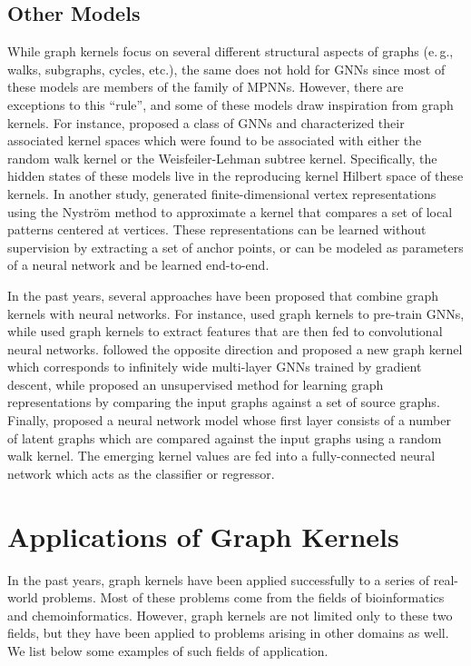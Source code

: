 \documentclass[twoside,11pt]{article}
\newcommand{\eg}{e.\,g., }
\begin{document}
\subsection{Other Models}
While graph kernels focus on several different structural aspects of graphs (\eg walks, subgraphs, cycles, etc.), the same does not hold for GNNs since most of these models are members of the family of MPNNs.
However, there are exceptions to this ``rule'', and some of these models draw inspiration from graph kernels.
For instance,  proposed a class of GNNs and characterized their associated kernel spaces which were found to be associated with either the random walk kernel or the Weisfeiler-Lehman subtree kernel.
Specifically, the hidden states of these models live in the reproducing kernel Hilbert space of these kernels.
In another study,  generated finite-dimensional vertex representations using the Nystr{\"o}m method to approximate a kernel that compares a set of local patterns centered at vertices.
These representations can be learned without supervision by extracting a set of anchor points, or can be modeled as parameters of a neural network and be learned end-to-end.

In the past years, several approaches have been proposed that combine graph kernels with neural networks.
For instance,  used graph kernels to pre-train GNNs, while  used graph kernels to extract features that are then fed to convolutional neural networks.
 followed the opposite direction and proposed a new graph kernel which corresponds to infinitely wide multi-layer GNNs trained by gradient descent, while  proposed an unsupervised method for learning graph representations by comparing the input graphs against a set of source graphs.
Finally,  proposed a neural network model whose first layer consists of a number of latent graphs which are compared against the input graphs using a random walk kernel.
The emerging kernel values are fed into a fully-connected neural network which acts as the classifier or regressor. 



\section{Applications of Graph Kernels}\label{sec:applications}
In the past years, graph kernels have been applied successfully to a series of real-world problems.
Most of these problems come from the fields of bioinformatics and chemoinformatics.
However, graph kernels are not limited only to these two fields, but they have been applied to problems arising in other domains as well.
We list below some examples of such fields of application.
\end{document}
